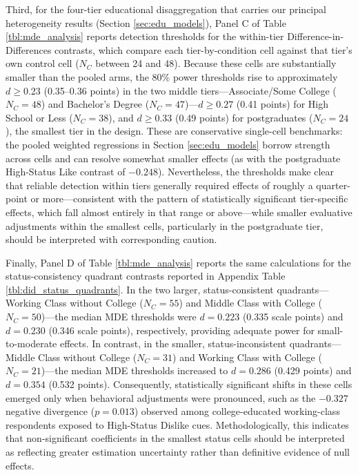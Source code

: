 \documentclass[12pt, letterpaper]{article}
\begin{document}
Third, for the four-tier educational disaggregation that carries our principal heterogeneity results (Section \ref{sec:edu_models}), Panel C of Table \ref{tbl:mde_analysis} reports detection thresholds for the within-tier Difference-in-Differences contrasts, which compare each tier-by-condition cell against that tier's own control cell ($N_C$ between 24 and 48). Because these cells are substantially smaller than the pooled arms, the 80\% power thresholds rise to approximately $d \ge 0.23$ (0.35--0.36 points) in the two middle tiers---Associate/Some College ($N_C = 48$) and Bachelor's Degree ($N_C = 47$)---$d \ge 0.27$ (0.41 points) for High School or Less ($N_C = 38$), and $d \ge 0.33$ (0.49 points) for postgraduates ($N_C = 24$), the smallest tier in the design. These are conservative single-cell benchmarks: the pooled weighted regressions in Section \ref{sec:edu_models} borrow strength across cells and can resolve somewhat smaller effects (as with the postgraduate High-Status Like contrast of $-0.248$). Nevertheless, the thresholds make clear that reliable detection within tiers generally required effects of roughly a quarter-point or more---consistent with the pattern of statistically significant tier-specific effects, which fall almost entirely in that range or above---while smaller evaluative adjustments within the smallest cells, particularly in the postgraduate tier, should be interpreted with corresponding caution.

Finally, Panel D of Table \ref{tbl:mde_analysis} reports the same calculations for the status-consistency quadrant contrasts reported in Appendix Table \ref{tbl:did_status_quadrants}. In the two larger, status-consistent quadrants—Working Class without College ($N_C = 55$) and Middle Class with College ($N_C = 50$)—the median MDE thresholds were $d = 0.223$ (0.335 scale points) and $d = 0.230$ (0.346 scale points), respectively, providing adequate power for small-to-moderate effects. In contrast, in the smaller, status-inconsistent quadrants—Middle Class without College ($N_C = 31$) and Working Class with College ($N_C = 21$)—the median MDE thresholds increased to $d = 0.286$ (0.429 points) and $d = 0.354$ (0.532 points). Consequently, statistically significant shifts in these cells emerged only when behavioral adjustments were pronounced, such as the $-0.327$ negative divergence ($p = 0.013$) observed among college-educated working-class respondents exposed to High-Status Dislike cues. Methodologically, this indicates that non-significant coefficients in the smallest status cells should be interpreted as reflecting greater estimation uncertainty rather than definitive evidence of null effects.
\end{document}

